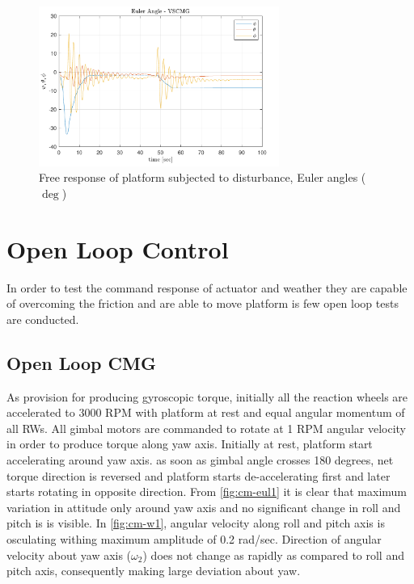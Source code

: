\begin{figure}[ht]
    \centering
    \includegraphics[width=0.7\textwidth]{figures/plots/exp/free-eul1.pdf}
    \caption{Free response of platform subjected to disturbance, Euler angles ($\deg$)}
    \label{fig:free-eul1}
\end{figure}

\section{Open Loop Control}
In order to test the command response of actuator and weather they are capable of overcoming the friction and are able to move platform is few open loop tests are conducted.
\subsection{Open Loop CMG}
As provision for producing gyroscopic torque, initially all the reaction wheels are accelerated to 3000 RPM with platform at rest and equal angular momentum of all RWs. All gimbal motors are commanded to rotate at 1 RPM angular velocity in order to produce torque along yaw axis. Initially at rest, platform start accelerating around yaw axis. as soon as gimbal angle crosses 180 degrees, net torque direction is reversed and platform starts de-accelerating first and later starts rotating in opposite direction. From \autoref{fig:cm-eul1} it is clear that maximum variation in attitude only around yaw axis and no significant change in roll and pitch is is visible. In \autoref{fig:cm-w1}, angular velocity along roll and pitch axis is osculating withing maximum amplitude of 0.2 rad/sec. Direction of angular velocity about yaw axis ($\omega_2$) does not change as rapidly as compared to roll and pitch axis, consequently making large deviation about yaw.

